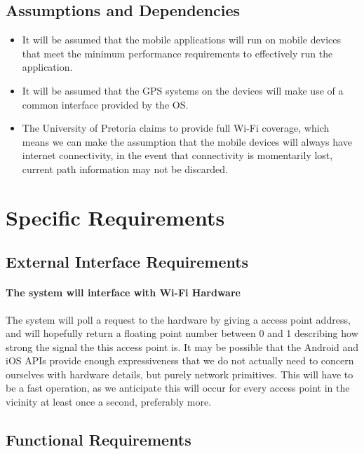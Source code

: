 \documentclass[12pt,a4paper]{article}
\begin{document}
		\subsection{Assumptions and Dependencies}
		
			\begin{itemize}

				\item It will be assumed that the mobile applications will run on mobile devices that 
				meet the minimum performance requirements to effectively run the application.
				\item It will be assumed that the GPS systems on the devices will make use of a common 
				interface provided by the OS.
				\item The University of Pretoria claims to provide full Wi-Fi coverage, which means we can 
				make the assumption that the mobile devices will always have internet connectivity, in the 
				event that connectivity is momentarily lost, current path information may not be discarded.

			\end{itemize}


	\section{Specific Requirements}

		\subsection{External Interface Requirements}

			\paragraph{The system will interface with Wi-Fi Hardware}

				The system will poll a request to the hardware by giving a access point
				address, and will hopefully return a floating point number between 0 and
				 1 describing how strong the signal the this access point is. It may be
				 possible that the Android and iOS APIs provide enough expressiveness
				 that we do not actually need to concern ourselves with hardware
				 details, but purely network primitives. This will have to be a fast
				operation, as we anticipate this will occur for every access point in
				the vicinity at least once a second, preferably more.


		\subsection{Functional Requirements}
\end{document}
